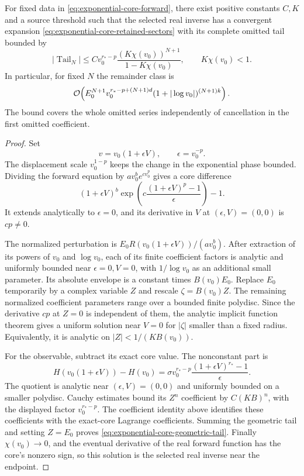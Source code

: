 \begin{theorem}
\label{thm:exponential-core-complete-tail}
For fixed data in \eqref{eq:exponential-core-forward}, there exist positive
constants $C,K$ and a source threshold such that the selected real inverse
has a convergent expansion \eqref{eq:exponential-core-retained-sectors}
with its complete omitted tail bounded by
\begin{equation}
 |\operatorname{Tail}_N|
 \le C v_0^{r_*-p}
 \frac{(K\chi(v_0))^{N+1}}{1-K\chi(v_0)},
 \qquad K\chi(v_0)<1.
 \label{eq:exponential-core-geometric-tail}
\end{equation}
In particular, for fixed $N$ the remainder class is
\begin{equation}
 \mathcal O\!\left(E_0^{N+1}
 v_0^{r_*-p+(N+1)d}(1+|\log v_0|)^{(N+1)k}\right).
 \label{eq:exponential-core-asymptotic-tail}
\end{equation}
The bound covers the whole omitted series independently of cancellation
in the first omitted coefficient.
\end{theorem}
\begin{proof}
Set
\[
 v=v_0(1+\epsilon V),\qquad\epsilon=v_0^{-p}.
\]
The displacement scale $v_0^{1-p}$ keeps the change in the exponential
phase bounded. Dividing the forward equation by $a v_0^b e^{cv_0^p}$
gives a core difference
\begin{equation}
 (1+\epsilon V)^b
 \exp\left(c\frac{(1+\epsilon V)^p-1}{\epsilon}\right)-1.
 \label{eq:exponential-core-normalized-equation}
\end{equation}
It extends analytically to $\epsilon=0$, and its derivative in $V$ at
$(\epsilon,V)=(0,0)$ is $cp\ne0$.

The normalized perturbation is
$E_0R(v_0(1+\epsilon V))/(a v_0^b)$.
After extraction of its powers of $v_0$ and $\log v_0$, each of its finite
coefficient factors is analytic and uniformly bounded near
$\epsilon=0,V=0$, with $1/\log v_0$ as an additional small parameter.
Its absolute envelope is a constant times $B(v_0)E_0$.
Replace $E_0$ temporarily by a complex variable $Z$ and rescale
$\zeta=B(v_0)Z$. The remaining normalized coefficient parameters range
over a bounded finite polydisc. Since the derivative $cp$ at $Z=0$ is
independent of them, the analytic implicit function theorem gives a
uniform solution near $V=0$ for $|\zeta|$ smaller than a fixed radius.
Equivalently, it is analytic on $|Z|<1/(K B(v_0))$.

For the observable, subtract its exact core value. The nonconstant part is
\[
 H(v_0(1+\epsilon V))-H(v_0)
 =\sigma v_0^{r_*-p}
 \frac{(1+\epsilon V)^{r_*}-1}{\epsilon}.
\]
The quotient is analytic near $(\epsilon,V)=(0,0)$ and uniformly bounded
on a smaller polydisc. Cauchy estimates bound its $Z^n$ coefficient by
$C(KB)^n$, with the displayed factor $v_0^{r_*-p}$.
The coefficient identity above identifies these coefficients with the
exact-core Lagrange coefficients. Summing the geometric tail and setting
$Z=E_0$ proves \eqref{eq:exponential-core-geometric-tail}.
Finally $\chi(v_0)\to0$, and the eventual derivative of the real forward
function has the core's nonzero sign, so this solution is the selected
real inverse near the endpoint.
\end{proof}

